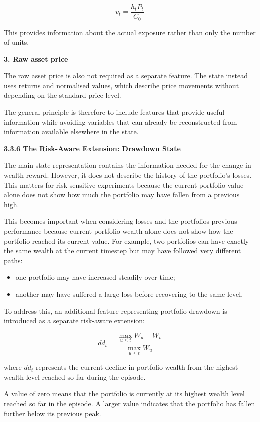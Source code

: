 \[v_{t} = \frac{h_{t}P_{t}}{C_{0}}\]

This provides information about the actual exposure rather than only the
number of units.

\textbf{3. Raw asset price}

The raw asset price is also not required as a separate feature. The
state instead uses returns and normalised values, which describe price
movements without depending on the standard price level.

The general principle is therefore to include features that provide
useful information while avoiding variables that can already be
reconstructed from information available elsewhere in the state.

\textbf{3.3.6 The Risk-Aware Extension: Drawdown State}

The main state representation contains the information needed for the
change in wealth reward. However, it does not describe the history of
the portfolio's losses. This matters for risk-sensitive experiments
because the current portfolio value alone does not show how much the
portfolio may have fallen from a previous high.

This becomes important when considering losses and the
portfolio\textquotesingle s previous performance because current
portfolio wealth alone does not show how the portfolio reached its
current value. For example, two portfolios can have exactly the same
wealth at the current timestep but may have followed very different
paths:

\begin{itemize}
\item
  one portfolio may have increased steadily over time;
\item
  another may have suffered a large loss before recovering to the same
  level.
\end{itemize}

To address this, an additional feature representing portfolio drawdown
is introduced as a separate risk-aware extension:

\[dd_{t} = \frac{\max_{u \leq t}W_{u} - W_{t}}{\max_{u \leq t}W_{u}}\]

where \(dd_{t}\) represents the current decline in portfolio wealth from
the highest wealth level reached so far during the episode.

A value of zero means that the portfolio is currently at its highest
wealth level reached so far in the episode. A larger value indicates
that the portfolio has fallen further below its previous peak.


